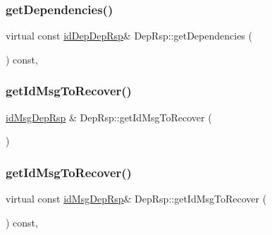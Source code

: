\mbox{\label{class_dep_rsp_ad7d207f5cb583e04c7a8a6127bcb3fff}} 
\subsubsection{\texorpdfstring{get\+Dependencies()}{getDependencies()}\hspace{0.1cm}{\footnotesize\ttfamily [2/2]}}
{\footnotesize\ttfamily virtual const \hyperlink{dep_rsp__m_8h_a3c2ceb107008eb344443aaab2eb872b8}{id\+Dep\+Dep\+Rsp}\& Dep\+Rsp\+::get\+Dependencies (\begin{DoxyParamCaption}{ }\end{DoxyParamCaption}) const\hspace{0.3cm}{\ttfamily [inline]}, {\ttfamily [virtual]}}

\mbox{\label{class_dep_rsp_a7558f4f82be1ce27c894a068e2811ec6}} 
\subsubsection{\texorpdfstring{get\+Id\+Msg\+To\+Recover()}{getIdMsgToRecover()}\hspace{0.1cm}{\footnotesize\ttfamily [1/2]}}
{\footnotesize\ttfamily \hyperlink{dep_rsp__m_8h_a8a41011e0821f196429cd4bc45638bcf}{id\+Msg\+Dep\+Rsp} \& Dep\+Rsp\+::get\+Id\+Msg\+To\+Recover (\begin{DoxyParamCaption}{ }\end{DoxyParamCaption})\hspace{0.3cm}{\ttfamily [virtual]}}

\mbox{\label{class_dep_rsp_a209fe969214c0bf673d12a27bb923f92}} 
\subsubsection{\texorpdfstring{get\+Id\+Msg\+To\+Recover()}{getIdMsgToRecover()}\hspace{0.1cm}{\footnotesize\ttfamily [2/2]}}
{\footnotesize\ttfamily virtual const \hyperlink{dep_rsp__m_8h_a8a41011e0821f196429cd4bc45638bcf}{id\+Msg\+Dep\+Rsp}\& Dep\+Rsp\+::get\+Id\+Msg\+To\+Recover (\begin{DoxyParamCaption}{ }\end{DoxyParamCaption}) const\hspace{0.3cm}{\ttfamily [inline]}, {\ttfamily [virtual]}}

